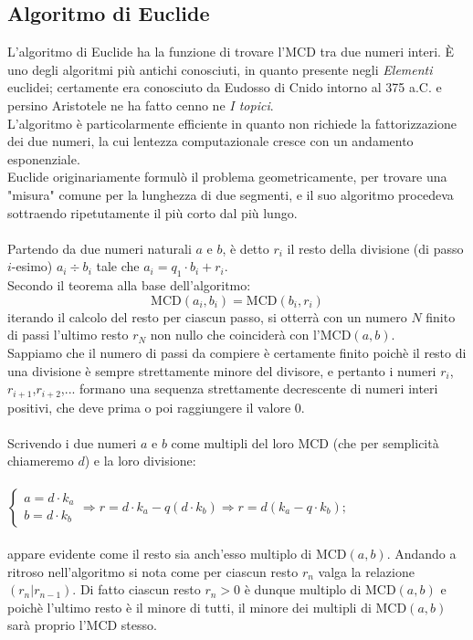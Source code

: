\subsection{Algoritmo di Euclide}
L'algoritmo di Euclide ha la funzione di trovare l'MCD tra due numeri interi. È uno degli algoritmi più antichi conosciuti, in quanto presente negli \emph{Elementi} euclidei; certamente era conosciuto da Eudosso di Cnido intorno al 375 a.C. e persino Aristotele ne ha fatto cenno ne \emph{I topici}.\\
L'algoritmo è particolarmente efficiente in quanto non richiede la fattorizzazione dei due numeri, la cui lentezza computazionale cresce con un andamento esponenziale.\\
Euclide originariamente formulò il problema geometricamente, per trovare una "misura" comune per la lunghezza di due segmenti, e il suo algoritmo procedeva sottraendo ripetutamente il più corto dal più lungo.\\\\
Partendo da due numeri naturali $a$ e $b$, è detto $r_i$ il resto della divisione (di passo $i$-esimo) $a_i \div b_i$ tale che $a_i=q_1\cdot b_i+r_i$. \\
Secondo il teorema alla base dell'algoritmo:
\begin{equation}
    \text{MCD}(a_i,b_i)= \text{MCD}(b_i,r_i)
\end{equation}
iterando il calcolo del resto per ciascun passo, si otterrà con un numero $N$ finito di passi l'ultimo resto $r_N$ non nullo che coinciderà con l'MCD$(a,b)$.\\
Sappiamo che il numero di passi da compiere è certamente finito poichè il resto di una divisione è sempre strettamente minore del divisore, e pertanto i numeri
$r_i$,$r_{i+1}$,$r_{i+2}$,... formano una sequenza strettamente decrescente di numeri interi positivi, che deve
prima o poi raggiungere il valore 0.\\\\
Scrivendo i due numeri $a$ e $b$ come multipli del loro MCD (che per semplicità chiameremo $d$) e la loro divisione:\\\\
$\left \{ \begin{array}{rl}
a=d \cdot k_a
\\b=d \cdot k_b
\end{array}
\right. \Rightarrow r=d \cdot k_a - q (d \cdot k_b) \Rightarrow r = d (k_a - q \cdot k_b);$\\\\
appare evidente come il resto sia anch'esso multiplo di MCD$(a,b)$. Andando a ritroso nell'algoritmo si nota come per ciascun resto $r_n$ valga la relazione $(r_n|r_{n-1})$. Di fatto ciascun resto $r_n > 0$ è dunque multiplo di MCD$(a,b)$ e poichè l'ultimo resto è il minore di tutti, il minore dei multipli di MCD$(a,b)$ sarà proprio l'MCD stesso.
